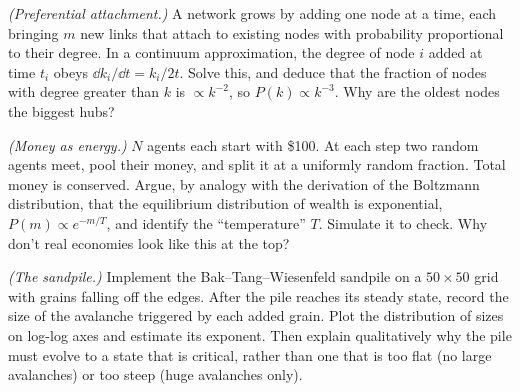 \begin{problems}
\core \label{prob:ba} \emph{(Preferential attachment.)} A network grows by adding one node at a time, each bringing $m$ new links that attach to existing nodes with probability proportional to their degree. In a continuum approximation, the degree of node $i$ added at time $t_i$ obeys $\dd k_i/\dd t = k_i/2t$. Solve this, and deduce that the fraction of nodes with degree greater than $k$ is $\propto k^{-2}$, so $P(k)\propto k^{-3}$. Why are the oldest nodes the biggest hubs?

 \label{prob:money} \emph{(Money as energy.)} $N$ agents each start with \$100. At each step two random agents meet, pool their money, and split it at a uniformly random fraction. Total money is conserved. Argue, by analogy with the derivation of the Boltzmann distribution, that the equilibrium distribution of wealth is exponential, $P(m)\propto e^{-m/T}$, and identify the ``temperature'' $T$. Simulate it to check. Why don't real economies look like this at the top?

 \label{prob:sandpile} \emph{(The sandpile.)} Implement the Bak--Tang--Wiesenfeld sandpile on a $50\times50$ grid with grains falling off the edges. After the pile reaches its steady state, record the size of the avalanche triggered by each added grain. Plot the distribution of sizes on log-log axes and estimate its exponent. Then explain qualitatively why the pile must evolve to a state that is critical, rather than one that is too flat (no large avalanches) or too steep (huge avalanches only).
\end{problems}

\begin{reading}
\end{reading}
